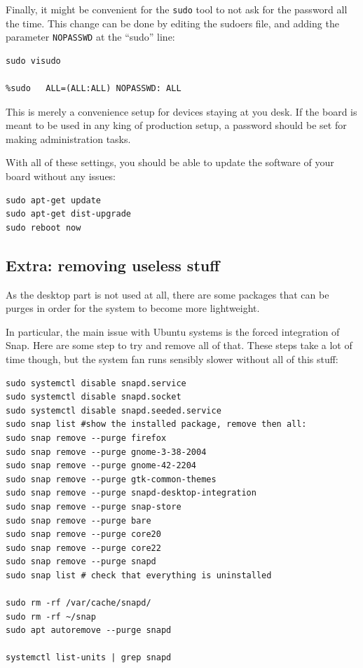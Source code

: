 \documentclass[10pt]{article}
\begin{document}
Finally, it might be convenient for the \verb|sudo| tool to not ask for the password all the time.
This change can be done by editing the sudoers file, and adding the parameter \verb|NOPASSWD|
at the ``sudo'' line:
\begin{tcolorbox}
\begin{verbatim}
sudo visudo

%sudo   ALL=(ALL:ALL) NOPASSWD: ALL
\end{verbatim}
\end{tcolorbox}

This is merely a convenience setup for devices staying at you desk. If
the board is meant to be used in any king of production setup, a password
should be set for making administration tasks.

With all of these settings, you should be able to update the software of your board
without any issues:
\begin{tcolorbox}
\begin{verbatim}
sudo apt-get update
sudo apt-get dist-upgrade
sudo reboot now
\end{verbatim}
\end{tcolorbox}

\subsection{Extra: removing useless stuff}
\label{sec:extr-remov-usel}
As the desktop part is not used at all, there are some packages
that can be purges in order for the system to become more lightweight.

In particular, the main issue with Ubuntu systems is the forced integration of Snap.
Here are some step to try and remove all of that. These steps
take a lot of time though, but the system fan runs sensibly slower
without all of this stuff:
\begin{tcolorbox}
\begin{verbatim}
sudo systemctl disable snapd.service
sudo systemctl disable snapd.socket
sudo systemctl disable snapd.seeded.service
sudo snap list #show the installed package, remove then all:
sudo snap remove --purge firefox
sudo snap remove --purge gnome-3-38-2004
sudo snap remove --purge gnome-42-2204
sudo snap remove --purge gtk-common-themes
sudo snap remove --purge snapd-desktop-integration
sudo snap remove --purge snap-store
sudo snap remove --purge bare
sudo snap remove --purge core20
sudo snap remove --purge core22
sudo snap remove --purge snapd
sudo snap list # check that everything is uninstalled

sudo rm -rf /var/cache/snapd/
sudo rm -rf ~/snap
sudo apt autoremove --purge snapd

systemctl list-units | grep snapd
\end{verbatim}
\end{tcolorbox}
\end{document}
